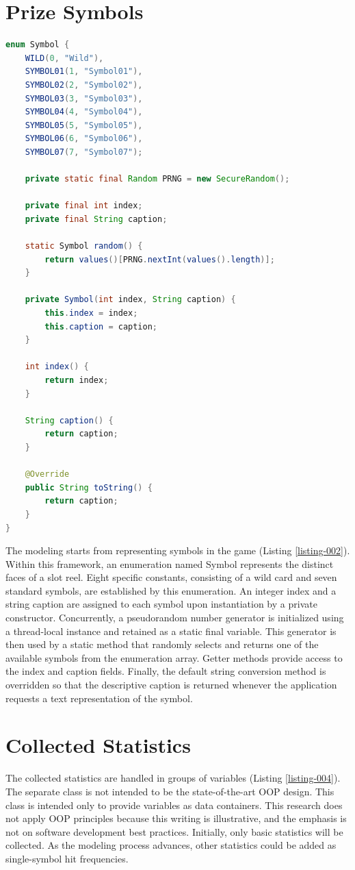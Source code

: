 \documentclass[12pt,twoside,openany]{book}
\begin{document}
\section{Prize Symbols}

\begin{lstlisting}[language=Java, caption={Prize symbols}, label=listing-002]
enum Symbol {
	WILD(0, "Wild"),
	SYMBOL01(1, "Symbol01"),
	SYMBOL02(2, "Symbol02"),
	SYMBOL03(3, "Symbol03"),
	SYMBOL04(4, "Symbol04"),
	SYMBOL05(5, "Symbol05"),
	SYMBOL06(6, "Symbol06"),
	SYMBOL07(7, "Symbol07");

	private static final Random PRNG = new SecureRandom();

	private final int index;
	private final String caption;

	static Symbol random() {
		return values()[PRNG.nextInt(values().length)];
	}

	private Symbol(int index, String caption) {
		this.index = index;
		this.caption = caption;
	}

	int index() {
		return index;
	}

	String caption() {
		return caption;
	}

	@Override
	public String toString() {
		return caption;
	}
}
\end{lstlisting}

The modeling starts from representing symbols in the game (Listing \ref{listing-002}). Within this framework, an enumeration named Symbol represents the distinct faces of a slot reel. Eight specific constants, consisting of a wild card and seven standard symbols, are established by this enumeration. An integer index and a string caption are assigned to each symbol upon instantiation by a private constructor. Concurrently, a pseudorandom number generator is initialized using a thread-local instance and retained as a static final variable. This generator is then used by a static method that randomly selects and returns one of the available symbols from the enumeration array. Getter methods provide access to the index and caption fields. Finally, the default string conversion method is overridden so that the descriptive caption is returned whenever the application requests a text representation of the symbol.

\section{Collected Statistics}

The collected statistics are handled in groups of variables (Listing \ref{listing-004}). The separate class is not intended to be the state-of-the-art OOP design. This class is intended only to provide variables as data containers. This research does not apply OOP principles because this writing is illustrative, and the emphasis is not on software development best practices. Initially, only basic statistics will be collected. As the modeling process advances, other statistics could be added as single-symbol hit frequencies.
\end{document}
